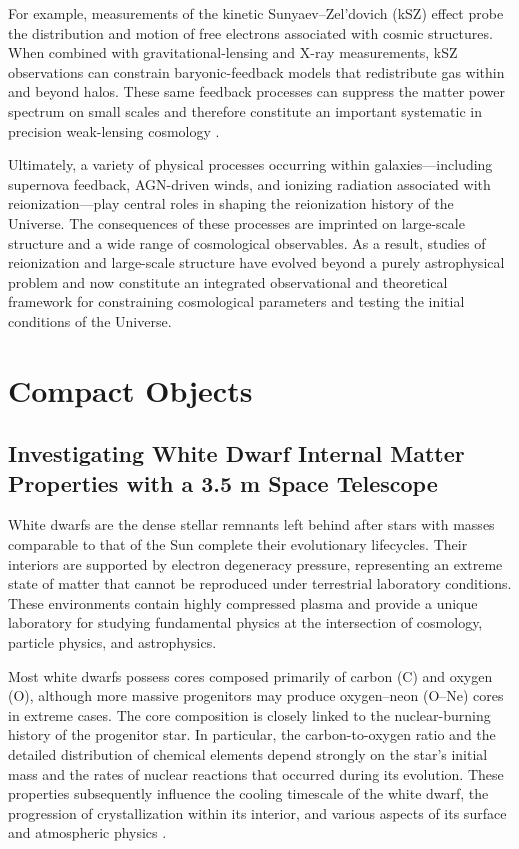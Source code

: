 For example, measurements of the kinetic Sunyaev--Zel'dovich (kSZ) effect probe the distribution and motion of free electrons associated with cosmic structures. When combined with gravitational-lensing and X-ray measurements, kSZ observations can constrain baryonic-feedback models that redistribute gas within and beyond halos. These same feedback processes can suppress the matter power spectrum on small scales and therefore constitute an important systematic in precision weak-lensing cosmology \cite{siegel2025}.

Ultimately, a variety of physical processes occurring within galaxies---including supernova feedback, AGN-driven winds, and ionizing radiation associated with reionization---play central roles in shaping the reionization history of the Universe. The consequences of these processes are imprinted on large-scale structure and a wide range of cosmological observables. As a result, studies of reionization and large-scale structure have evolved beyond a purely astrophysical problem and now constitute an integrated observational and theoretical framework for constraining cosmological parameters and testing the initial conditions of the Universe.

\section{Compact Objects}

\subsection{Investigating White Dwarf Internal Matter Properties with a 3.5 m Space Telescope}

White dwarfs are the dense stellar remnants left behind after stars with masses comparable to that of the Sun complete their evolutionary lifecycles. Their interiors are supported by electron degeneracy pressure, representing an extreme state of matter that cannot be reproduced under terrestrial laboratory conditions. These environments contain highly compressed plasma and provide a unique laboratory for studying fundamental physics at the intersection of cosmology, particle physics, and astrophysics.

Most white dwarfs possess cores composed primarily of carbon (C) and oxygen (O), although more massive progenitors may produce oxygen--neon (O--Ne) cores in extreme cases. The core composition is closely linked to the nuclear-burning history of the progenitor star. In particular, the carbon-to-oxygen ratio and the detailed distribution of chemical elements depend strongly on the star's initial mass and the rates of nuclear reactions that occurred during its evolution. These properties subsequently influence the cooling timescale of the white dwarf, the progression of crystallization within its interior, and various aspects of its surface and atmospheric physics \cite{salaris1997}.

